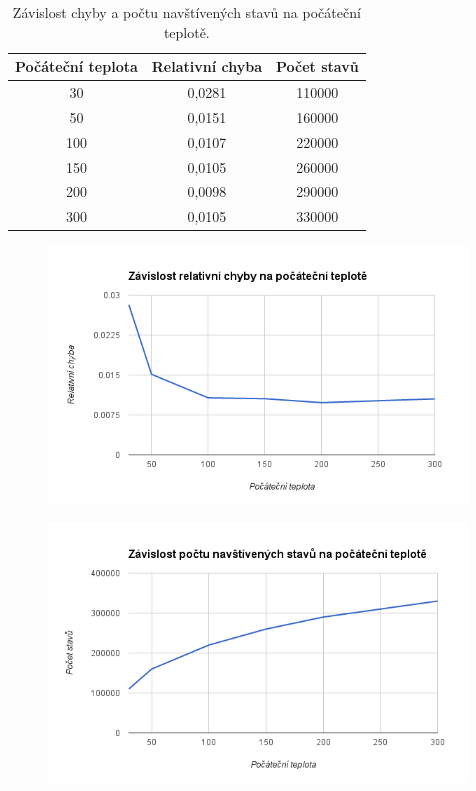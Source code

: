 \documentclass[10pt,a4paper]{article}
\begin{document}
\begin{table}[H]
\centering
  \begin{tabular}{ |c|c|c|}
  \hline
  Počáteční teplota & Relativní chyba & Počet stavů \\
  \hline
  30  & 0,0281 & 110000 \\
  50  & 0,0151 & 160000 \\
  100 & 0,0107 & 220000 \\ 
  150 & 0,0105 & 260000 \\
  200 & 0,0098 & 290000 \\
  300 & 0,0105 & 330000 \\    
  \hline
  \end{tabular}
  \caption{Závislost chyby a počtu navštívených stavů na počáteční teplotě.}
\end{table}

\begin{figure}[H]\centering
 \includegraphics[width=0.99\textwidth]{1}
\end{figure}

\begin{figure}[H]\centering
 \includegraphics[width=0.99\textwidth]{2}
\end{figure}
\end{document}
